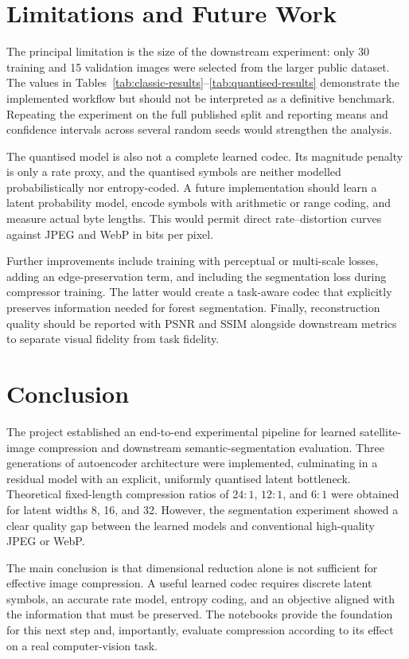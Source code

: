 \documentclass[10pt,a4paper]{article}
\begin{document}
\section{Limitations and Future Work}

The principal limitation is the size of the downstream experiment: only 30
training and 15 validation images were selected from the larger public
dataset. The values in Tables~\ref{tab:classic-results}--\ref{tab:quantised-results}
demonstrate the implemented
workflow but should not be interpreted as a definitive benchmark. Repeating
the experiment on the full published split and reporting means and confidence
intervals across several random seeds would strengthen the analysis.

The quantised model is also not a complete learned codec. Its magnitude
penalty is only a rate proxy, and the quantised symbols are neither modelled
probabilistically nor entropy-coded. A future implementation should learn a
latent probability model, encode symbols with arithmetic or range coding, and
measure actual byte lengths. This would permit direct rate--distortion curves
against JPEG and WebP in bits per pixel.

Further improvements include training with perceptual or multi-scale losses,
adding an edge-preservation term, and including the segmentation loss during
compressor training. The latter would create a task-aware codec that explicitly
preserves information needed for forest segmentation. Finally, reconstruction
quality should be reported with PSNR and SSIM alongside downstream metrics to
separate visual fidelity from task fidelity.

\section{Conclusion}

The project established an end-to-end experimental pipeline for learned
satellite-image compression and downstream semantic-segmentation evaluation.
Three generations of autoencoder architecture were implemented, culminating
in a residual model with an explicit, uniformly quantised latent bottleneck.
Theoretical fixed-length compression ratios of \(24{:}1\), \(12{:}1\), and
\(6{:}1\) were obtained for latent widths 8, 16, and 32. However, the
segmentation experiment showed a clear quality gap between the learned models
and conventional high-quality JPEG or WebP.

The main conclusion is that dimensional reduction alone is not sufficient for
effective image compression. A useful learned codec requires discrete latent
symbols, an accurate rate model, entropy coding, and an objective aligned with
the information that must be preserved. The notebooks provide the foundation
for this next step and, importantly, evaluate compression according to its
effect on a real computer-vision task.
\end{document}
